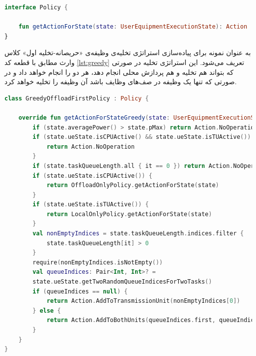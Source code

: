 \begin{LTR}
	\begin{lstlisting}[language=Kotlin, caption={واسط \lr{Policy}}, captiondirection=RTL, label={lst:policy}]
interface Policy {
	
	fun getActionForState(state: UserEquipmentExecutionState): Action
}
	\end{lstlisting}
\end{LTR}
به عنوان نمونه برای پیاده‌سازی استراتژی تخلیه‌ی وظیفه‌ی «حریصانه-تخلیه اول» کلاس وارث مطابق با قطعه کد \ref{lst:greedy} تعریف می‌شود. این استراتژی تخلیه در صورتی که بتواند هم تخلیه و هم پردازش محلی انجام دهد، هر دو را انجام خواهد داد و در صورتی که تنها یک وظیفه در صف‌های وظایف باشد آن وظیفه را تخلیه خواهد کرد.
\begin{LTR}
	\begin{lstlisting}[language=Kotlin, caption={پیاده‌سازی استراتژی تخلیه‌ی وظیفه‌ی حریصانه-تخلیه‌ی اول}, captiondirection=RTL, label={lst:greedy}]
class GreedyOffloadFirstPolicy : Policy {
	
	override fun getActionForStateGreedy(state: UserEquipmentExecutionState): Action {
		if (state.averagePower() > state.pMax) return Action.NoOperation
		if (state.ueState.isCPUActive() && state.ueState.isTUActive()) {
			return Action.NoOperation
		}
		if (state.taskQueueLength.all { it == 0 }) return Action.NoOperation
		if (state.ueState.isCPUActive()) {
			return OffloadOnlyPolicy.getActionForState(state)
		}
		if (state.ueState.isTUActive()) {
			return LocalOnlyPolicy.getActionForState(state)
		}
		val nonEmptyIndices = state.taskQueueLength.indices.filter {
			state.taskQueueLength[it] > 0
		}
		require(nonEmptyIndices.isNotEmpty())
		val queueIndices: Pair<Int, Int>? = 
		state.ueState.getTwoRandomQueueIndicesForTwoTasks()
		if (queueIndices == null) {
			return Action.AddToTransmissionUnit(nonEmptyIndices[0])
		} else {
			return Action.AddToBothUnits(queueIndices.first, queueIndices.second)
		}
	}
}
	\end{lstlisting}
\end{LTR}
